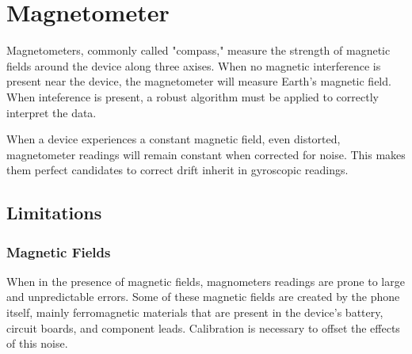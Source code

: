 \documentclass{acm_proc_article-sp}
\begin{document}

\section{Magnetometer}

Magnetometers, commonly called "compass," measure the strength of magnetic fields around the device
along three axises.  When no magnetic interference is present near the device, the magnetometer will measure Earth's 
magnetic field.  When inteference is present, a robust algorithm must be applied to correctly interpret the data.\cite{psiaki1990three}

When a device experiences a constant magnetic field, even distorted, magnetometer readings will remain constant when corrected for noise.  
This makes them perfect candidates to correct drift inherit in gyroscopic readings.\cite{roetenberg2005compensation}

\subsection{Limitations}
\subsubsection{Magnetic Fields}

When in the presence of magnetic fields, magnometers readings are prone
to large and unpredictable errors.\cite{luinge2005measuring} Some of these magnetic fields
are created by the phone itself, mainly ferromagnetic materials that are present in the device's
battery, circuit boards, and component leads.  Calibration is necessary to offset the effects
of this noise.\cite{roetenberg2005compensation}
\end{document}
